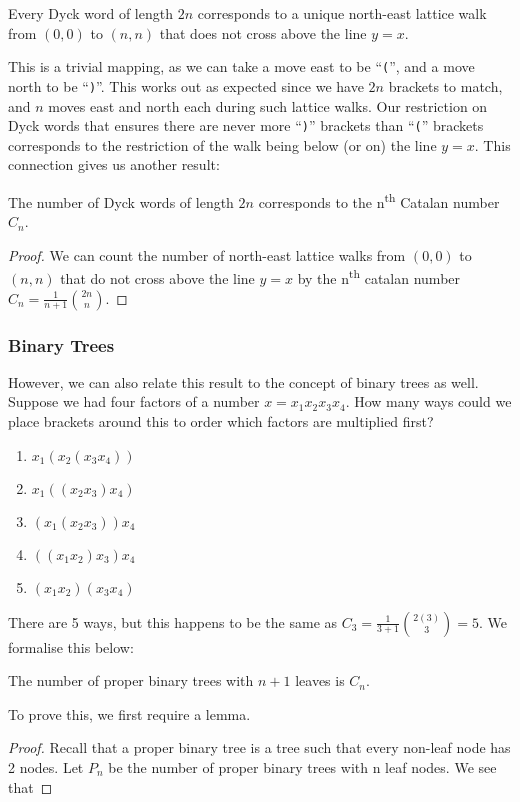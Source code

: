 \begin{theorem}
    Every Dyck word of length $2n$ corresponds to a unique north-east lattice walk from $(0, 0)$ to $(n, n)$ that does not cross above the line $y = x$. 
\end{theorem}

\noindent This is a trivial mapping, as we can take a move east to be ``\texttt{(}'', and a move north to be ``\texttt{)}''. This works out as expected since we have $2n$ brackets to match, and $n$ moves east and north each during such lattice walks. Our restriction on Dyck words that ensures there are never more ``\texttt{)}'' brackets than ``\texttt{(}'' brackets corresponds to the restriction of the walk being below (or on) the line $y = x$. This connection gives us another result:

\begin{theorem}
    The number of Dyck words of length $2n$ corresponds to the n\textsuperscript{th} Catalan number $C_{n}$.
\end{theorem}
\begin{proof}
    We can count the number of north-east lattice walks from $(0, 0)$ to $(n, n)$ that do not cross above the line $y=x$ by the n\textsuperscript{th} catalan number $C_{n} = \frac{1}{n+1} {2n \choose n}$. 
\end{proof}

\subsubsection{Binary Trees}
\noindent However, we can also relate this result to the concept of binary trees as well. Suppose we had four factors of a number $x = x_{1}x_{2}x_{3}x_{4}$. How many ways could we place brackets around this to order which factors are multiplied first?
\begin{enumerate}
    \item $x_{1}(x_{2}(x_{3}x_{4}))$
    \item $x_{1}((x_{2}x_{3})x_{4})$
    \item $(x_{1}(x_{2}x_{3}))x_{4}$
    \item $((x_{1}x_{2})x_{3})x_{4}$
    \item $(x_{1}x_{2})(x_{3}x_{4})$
\end{enumerate}
There are 5 ways, but this happens to be the same as $C_3 = \frac{1}{3+1} {2(3) \choose 3} = 5$. We formalise this below:

\begin{theorem}
    The number of proper binary trees with $n+1$ leaves is $C_n$.
\end{theorem}

To prove this, we first require a lemma. 
\begin{proof}
    Recall that a proper binary tree is a tree such that every non-leaf node has 2 nodes. Let $P_n$ be the number of proper binary trees with n leaf nodes. We see that 
\end{proof}